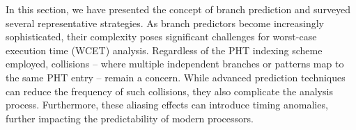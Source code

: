 In this section, we have presented the concept of branch prediction and surveyed several representative strategies. As branch predictors become increasingly sophisticated, their complexity poses significant challenges for worst-case execution time (WCET) analysis. Regardless of the PHT indexing scheme employed, collisions -- where multiple independent branches or patterns map to the same PHT entry -- remain a concern. While advanced prediction techniques can reduce the frequency of such collisions, they also complicate the analysis process. Furthermore, these aliasing effects can introduce timing anomalies, further impacting the predictability of modern processors.


